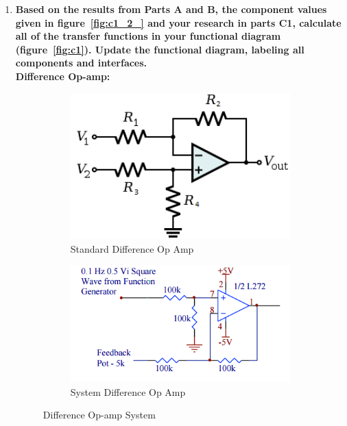 \documentclass[11pt,a4paper]{article}
\begin{document}
\begin{enumerate}
    
    
    \pagebreak
	\item \textbf{Based on the results from Parts A and B, the component values given in figure~\ref{fig:c1_2_} and your research in parts C1, calculate all of the transfer functions in your functional diagram (figure~\ref{fig:c1}). Update the functional diagram, labeling all components and interfaces.}  \\
    
    \textbf{Difference Op-amp:}\\
    \begin{figure}[H]
    \centering
		\begin{subfigure}{0.4\textwidth}
		\includegraphics[width=1\textwidth]{FigsC/differenceOpAmp.png}
		\caption{Standard Difference Op Amp}
		\label{fig:subim1}
		\end{subfigure}
		\begin{subfigure}{0.5\textwidth}
		\includegraphics[width=1\textwidth]{FigsC/c2b.png}
		\caption{System Difference Op Amp}
		\label{fig:subim1}
		\end{subfigure}		
	\caption{\label{fig:diffamp}Difference Op-amp System}
	\end{figure}


\end{enumerate}
\end{document}
